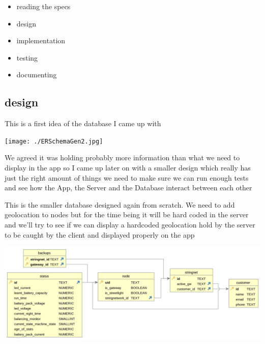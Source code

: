 \documentclass[a4paper,12pt]{article}
\begin{document}
\begin{itemize}
\item {reading the specs}
\item design
\item implementation
\item testing 
\item documenting
\end{itemize}

\clearpage

\subsection{design}
This is a first idea of the database I came up with

\noindent \texttt{[image: ./ERSchemaGen2.jpg]}

We agreed it was holding probably more information than what we need to display in the app so I came up later on with a smaller design which really has just the right amount of things we need to make sure we can run enough tests and see how the App, the Server and the Database interact between each other
\clearpage

This is the smaller database designed again from scratch. We need to add geolocation to nodes but for the time being it will be hard coded in the server and we'll try to see if we can display a hardcoded geolocation hold by the server to be caught by the client and displayed properly on the app

\noindent \includegraphics[width=14cm]{./SecondERSchemaGen2.jpg}

\printindex
\end{document}
